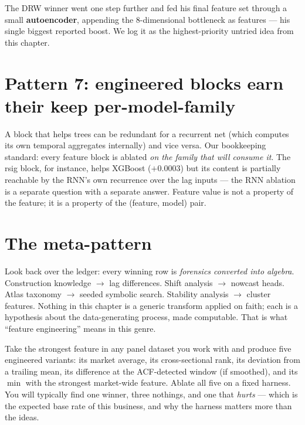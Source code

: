The DRW winner went one step further and fed his final feature set through
a small \textbf{autoencoder}, appending the 8-dimensional bottleneck as
features --- his single biggest reported boost. We log it as the
highest-priority untried idea from this chapter.

\section{Pattern 7: engineered blocks earn their keep per-model-family}

A block that helps trees can be redundant for a recurrent net (which
computes its own temporal aggregates internally) and vice versa. Our
bookkeeping standard: every feature block is ablated \emph{on the family
that will consume it}. The rsig block, for instance, helps XGBoost
($+0.0003$) but its content is partially reachable by the RNN's own
recurrence over the lag inputs --- the RNN ablation is a separate question
with a separate answer. Feature value is not a property of the feature;
it is a property of the (feature, model) pair.

\section{The meta-pattern}

Look back over the ledger: every winning row is \emph{forensics converted
into algebra}. Construction knowledge $\to$ lag differences. Shift analysis
$\to$ nowcast heads. Atlas taxonomy $\to$ seeded symbolic search. Stability
analysis $\to$ cluster features. Nothing in this chapter is a generic
transform applied on faith; each is a hypothesis about the data-generating
process, made computable. That is what ``feature engineering'' means in
this genre.

\begin{drillbox}
Take the strongest feature in any panel dataset you work with and produce
five engineered variants: its market average, its cross-sectional rank,
its deviation from a trailing mean, its difference at the ACF-detected
window (if smoothed), and its $\min$ with the strongest market-wide
feature. Ablate all five on a fixed harness. You will typically find one
winner, three nothings, and one that \emph{hurts} --- which is the expected
base rate of this business, and why the harness matters more than the
ideas.
\end{drillbox}
